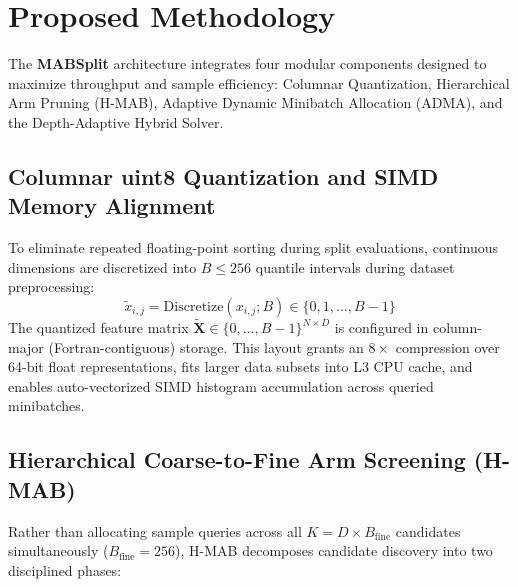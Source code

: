 \section{Proposed Methodology}
\label{sec:methodology}

The \textbf{MABSplit} architecture integrates four modular components designed to maximize throughput and sample efficiency: Columnar Quantization, Hierarchical Arm Pruning (H-MAB), Adaptive Dynamic Minibatch Allocation (ADMA), and the Depth-Adaptive Hybrid Solver.

\subsection{Columnar uint8 Quantization and SIMD Memory Alignment}
To eliminate repeated floating-point sorting during split evaluations, continuous dimensions are discretized into $B \le 256$ quantile intervals during dataset preprocessing:
\begin{equation}
\tilde{x}_{i, j} = \text{Discretize}(x_{i, j}; B) \in \{0, 1, \dots, B-1\}
\end{equation}
The quantized feature matrix $\mathbf{\tilde{X}} \in \{0, \dots, B-1\}^{N \times D}$ is configured in column-major (Fortran-contiguous) storage. This layout grants an $8\times$ compression over 64-bit float representations, fits larger data subsets into L3 CPU cache, and enables auto-vectorized SIMD histogram accumulation across queried minibatches.

\subsection{Hierarchical Coarse-to-Fine Arm Screening (H-MAB)}
Rather than allocating sample queries across all $K = D \times B_{\text{fine}}$ candidates simultaneously ($B_{\text{fine}} = 256$), H-MAB decomposes candidate discovery into two disciplined phases:

